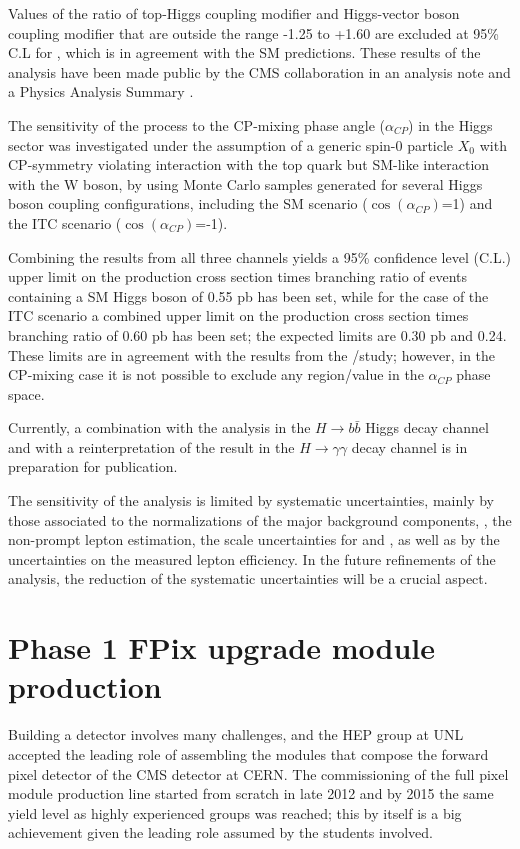 Values of the ratio of top-Higgs coupling modifier \Ct and Higgs-vector boson coupling modifier \CV that are outside the range -1.25 to +1.60 are excluded at 95\% C.L for , which is in agreement with the SM predictions. These results of the analysis have been made public by the CMS collaboration in an analysis note \cite{CMS_AN_2016-378} and a Physics Analysis Summary \cite{CMS_PAS_HIG_17-005}.

The sensitivity of the \tH process to the CP-mixing phase angle ($\alpha_{CP}$) in the Higgs sector was investigated under the assumption of a generic spin-0 particle $X_0$ with CP-symmetry violating interaction with the top quark but SM-like interaction with the W boson, by using Monte Carlo samples generated for several Higgs boson coupling configurations, including the SM scenario ($\cos(\alpha_{CP})$=1) and the ITC scenario ($\cos (\alpha_{CP})$=-1).  

Combining the results from all three channels yields a 95\% confidence level (C.L.) upper limit on the production cross section times branching ratio of events containing a SM Higgs boson of 0.55 pb has been set, while for the case of the ITC scenario a combined upper limit on the production cross section times branching ratio of 0.60 pb has been set; the expected limits are 0.30 pb and 0.24. These limits are in agreement with the results from the \Ct/\CV study; however, in the CP-mixing case it is not possible to exclude any region/value in the $\alpha_{CP}$ phase space.

Currently, a combination with the \tH analysis in the $H \to b\bar{b}$ Higgs decay channel and with a reinterpretation of the \ttH result in the $H\to \gamma\gamma$ decay channel is in preparation for publication.

The sensitivity of the analysis is limited by systematic uncertainties, mainly by those associated to the normalizations of the major background components, \ie, the non-prompt lepton estimation, the scale uncertainties for \ttW and \ttZ, as well as by the uncertainties on the measured lepton efficiency. In the future refinements of the analysis, the reduction of the systematic uncertainties will be a crucial aspect.  



\section{Phase 1 FPix upgrade module production}

Building a detector involves many challenges, and the HEP group at UNL accepted the leading role of assembling the modules that compose the forward pixel detector of the CMS detector at CERN. The commissioning of the full pixel module production line started from scratch in late 2012 and by 2015 the same yield level as highly experienced groups was reached; this by itself is a big achievement given the leading role assumed by the students involved. %

